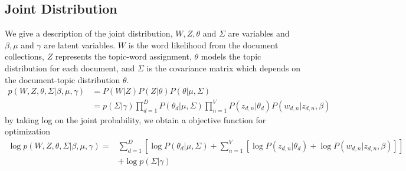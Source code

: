 \subsection{Joint Distribution}
We give a description of the joint distribution, $ W,Z,\theta $ and $ \Sigma $ are variables and $ \beta, \mu $ and $ \gamma $ are latent variables. $ W $ is the word likelihood from the document collections, $ Z $ represents the topic-word assignment, $ \theta $ models the topic distribution for each document, and $ \Sigma $ is the covariance matrix which depends on the document-topic distribution $ \theta $.
\begin{align*}
p(W,Z,\theta,\Sigma|\beta,\mu,\gamma)&=P(W|Z)P(Z|\theta)P(\theta|\mu,\Sigma)\\
&=p(\Sigma|\gamma)\prod_{d=1}^{D}P(\theta_d|\mu,\Sigma)\prod_{n=1}^{V}P(z_{d,n}|\theta_d)P(w_{d,n}|z_{d,n},\beta)
\end{align*}
by taking  log on the joint probability, we obtain a objective function for optimization
\begin{align*}
\log p(W,Z,\theta,\Sigma|\beta,\mu,\gamma)=&\sum_{d=1}^{D}\left[\log P(\theta_d|\mu,\Sigma)+\sum_{n=1}^{V}\left[\log P(z_{d,n}|\theta_d)+\log P(w_{d,n}|z_{d,n},\beta)\right]\right]\\
&+\log p(\Sigma|\gamma)
\end{align*}